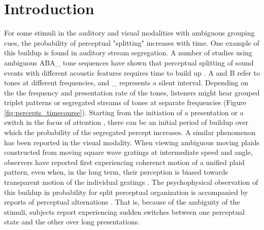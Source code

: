 \documentclass[10pt]{article}
\begin{document}
\section*{Introduction}
For some stimuli in the auditory and visual modalities with ambiguous grouping cues, the probability of perceptual "splitting" increases with time. One example of this buildup is found in auditory stream segregation. A number of studies using ambiguous ABA_ tone sequences \cite{Noorden1975} have shown that perceptual splitting of sound events with different acoustic features requires time to build up \cite{Bregman1978, Anstis1985}.  A and B refer to tones at different frequencies, and _ represents a silent interval. Depending on the the frequency and presentation rate of the tones, listeners might hear grouped triplet patterns or segregated streams of tones at separate frequencies (Figure \ref{fig:percepts_timecourse}). Starting from the initiation of a presentation \cite{Bregman1978, Anstis1985} or a switch in the focus of attention \cite{Cusack2004}, there can be an initial period of buildup over which the probability of the segregated percept increases. A similar phenomenon has been reported in the visual modality. When viewing ambiguous moving plaids constructed from moving square wave gratings at intermediate speed and angle, observers have reported first experiencing coherenct motion of a unified plaid pattern, even when, in the long term, their perception is biased towards transparent motion of the individual gratings \cite{Rubin2004}. The psychophysical observation of this buildup in probability for split perceptual organization is accompanied by reports of perceptual alternations \cite{Dieke2012,Denham,buildup+alternations, some plaid buildups}. That is, because of the ambiguity of the stimuli, subjects report experiencing sudden switches between one perceptual state and the other \cite{Pressnitzer2006, Hupe2012} over long presentations.
\end{document}
